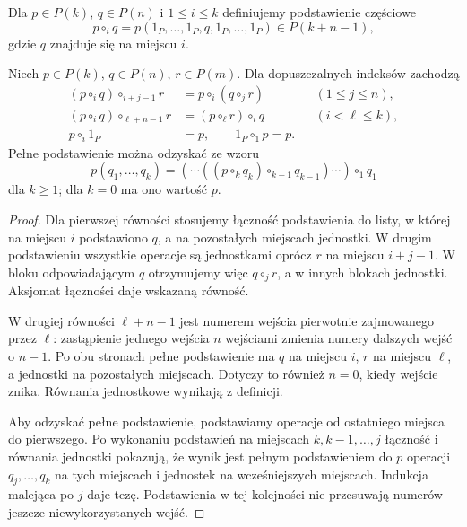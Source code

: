 \begin{center}
\end{center}

Dla $p\in P(k)$, $q\in P(n)$ i $1\leq i\leq k$ definiujemy podstawienie częściowe
\[
 p\circ_i q=p(1_P,\ldots,1_P,q,1_P,\ldots,1_P)
 \in P(k+n-1),
\]
gdzie $q$ znajduje się na miejscu $i$.

\begin{stwierdzenie}\label{cat:prop:operad-partial-composition}
Niech $p\in P(k)$, $q\in P(n)$, $r\in P(m)$. Dla dopuszczalnych indeksów zachodzą
\[
\begin{aligned}
 (p\circ_i q)\circ_{i+j-1}r&=p\circ_i(q\circ_j r)
       &&(1\leq j\leq n),\\
 (p\circ_i q)\circ_{\ell+n-1}r&=(p\circ_\ell r)\circ_i q
       &&(i<\ell\leq k),\\
 p\circ_i1_P&=p,\qquad 1_P\circ_1p=p.
\end{aligned}
\]
Pełne podstawienie można odzyskać ze wzoru
\[
 p(q_1,\ldots,q_k)
 =(\cdots((p\circ_k q_k)\circ_{k-1}q_{k-1})\cdots)
       \circ_1 q_1
\]
dla $k\geq1$; dla $k=0$ ma ono wartość $p$.
\end{stwierdzenie}
\begin{proof}
Dla pierwszej równości stosujemy łączność podstawienia do listy, w której na miejscu $i$ podstawiono $q$, a na pozostałych miejscach jednostki. W drugim podstawieniu wszystkie operacje są jednostkami oprócz $r$ na miejscu $i+j-1$. W bloku odpowiadającym $q$ otrzymujemy więc $q\circ_jr$, a w innych blokach jednostki. Aksjomat łączności daje wskazaną równość.

W drugiej równości $\ell+n-1$ jest numerem wejścia pierwotnie zajmowanego przez $\ell$: zastąpienie jednego wejścia $n$ wejściami zmienia numery dalszych wejść o $n-1$. Po obu stronach pełne podstawienie ma $q$ na miejscu $i$, $r$ na miejscu $\ell$, a jednostki na pozostałych miejscach. Dotyczy to również $n=0$, kiedy wejście znika. Równania jednostkowe wynikają z definicji.

Aby odzyskać pełne podstawienie, podstawiamy operacje od ostatniego miejsca do pierwszego. Po wykonaniu podstawień na miejscach $k,k-1,\ldots,j$ łączność i równania jednostki pokazują, że wynik jest pełnym podstawieniem do $p$ operacji $q_j,\ldots,q_k$ na tych miejscach i jednostek na wcześniejszych miejscach. Indukcja malejąca po $j$ daje tezę. Podstawienia w tej kolejności nie przesuwają numerów jeszcze niewykorzystanych wejść.
\end{proof}

